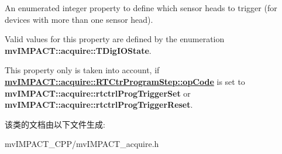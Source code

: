 An enumerated integer property to define which sensor heads to trigger (for devices with more than one sensor head). 

Valid values for this property are defined by the enumeration {\bfseries mv\+I\+M\+P\+A\+C\+T\+::acquire\+::\+T\+Dig\+I\+O\+State}.

This property only is taken into account, if {\bfseries \hyperlink{classmv_i_m_p_a_c_t_1_1acquire_1_1_r_t_ctr_program_step_a823c9cad26ad628155d68130ad1d6d5d}{mv\+I\+M\+P\+A\+C\+T\+::acquire\+::\+R\+T\+Ctr\+Program\+Step\+::op\+Code}} is set to {\bfseries mv\+I\+M\+P\+A\+C\+T\+::acquire\+::rtctrl\+Prog\+Trigger\+Set} or {\bfseries mv\+I\+M\+P\+A\+C\+T\+::acquire\+::rtctrl\+Prog\+Trigger\+Reset}. 

该类的文档由以下文件生成\+:\begin{DoxyCompactItemize}
\item 
mv\+I\+M\+P\+A\+C\+T\+\_\+\+C\+P\+P/mv\+I\+M\+P\+A\+C\+T\+\_\+acquire.\+h\end{DoxyCompactItemize}

